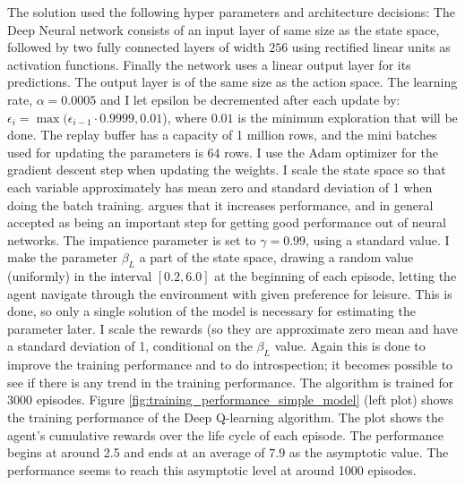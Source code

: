 The solution used the following hyper parameters and architecture decisions: The Deep Neural network consists of an input layer of same size as the state space, followed by two fully connected layers of width $256$ using rectified linear units as activation functions. Finally the network uses a linear output layer for its predictions. The output layer is of the same size as the action space. The learning rate, $\alpha=0.0005$ and I let epsilon be decremented after each update by: $\epsilon_i = \max (\epsilon_{i-1} \cdot 0.9999, 0.01$), where $0.01$ is the minimum exploration that will be done. The replay buffer has a capacity of 1 million rows, and the mini batches used for updating the parameters is $64$ rows. I use the Adam optimizer for the gradient descent step when updating the weights. I scale the state space so that each variable approximately has mean zero and standard deviation of 1 when doing the batch training. \textcite{goodfellow_deep_2016} argues that it increases performance, and in general accepted as being an important step for getting good performance out of neural networks. The impatience parameter is set to $\gamma=0.99$, using a standard value. I make the parameter $\beta_L$ a part of the state space, drawing a random value (uniformly) in the interval $[0.2, 6.0]$ at the beginning of each episode, letting the agent navigate through the environment with given preference for leisure. This is done, so only a single solution of the model is necessary for estimating the parameter later. I scale the rewards (so they are approximate zero mean and have a standard deviation of 1, conditional on the $\beta_L$ value. Again this is done to improve the training performance and to do introspection; it becomes possible to see if there is any trend in the training performance. The algorithm is trained for 3000 episodes. Figure \ref{fig:training_performance_simple_model}  (left plot) shows the training performance of the Deep Q-learning algorithm. The plot shows the agent's cumulative rewards over the life cycle of each episode. The performance begins at around 2.5 and ends at an average of $7.9$ as the asymptotic value. The performance seems to reach this asymptotic level at around 1000 episodes. 

